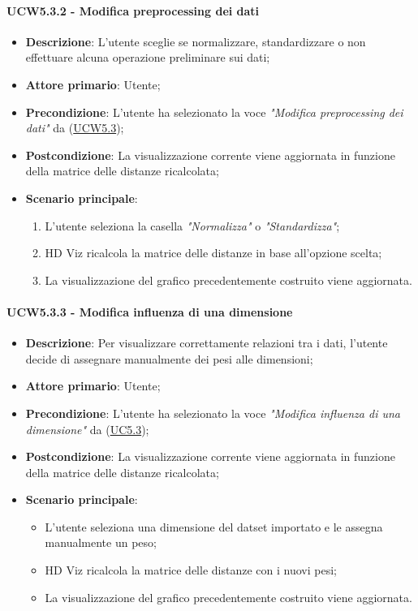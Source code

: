 \paragraph{UCW5.3.2 - Modifica preprocessing dei dati}
\label{par:ucw5.3.2}
\begin{itemize}
    \item \textbf{Descrizione}: L’utente sceglie se normalizzare, standardizzare o non effettuare alcuna operazione preliminare sui dati;

    \item \textbf{Attore primario}: Utente;
    \item \textbf{Precondizione}: L'utente ha selezionato la voce \emph{"Modifica preprocessing dei dati"} da (\hyperref[ssub:ucw5.3]{UCW5.3});
    \item \textbf{Postcondizione}: La visualizzazione corrente viene aggiornata in funzione della matrice delle distanze ricalcolata;
    \item \textbf{Scenario principale}:
          \begin{enumerate}
              \item L'utente seleziona la casella \emph{"Normalizza"} o \emph{"Standardizza"};
              \item HD Viz ricalcola la matrice delle distanze in base all'opzione scelta;
              \item La visualizzazione del grafico precedentemente costruito viene aggiornata.
          \end{enumerate}
\end{itemize}

\paragraph{UCW5.3.3 - Modifica influenza di una dimensione}
\label{par:ucw5.3.3}
\begin{itemize}
    \item \textbf{Descrizione}: Per visualizzare correttamente relazioni tra i dati,
          l’utente decide di assegnare manualmente dei pesi alle dimensioni;

    \item \textbf{Attore primario}: Utente;
    \item \textbf{Precondizione}: L'utente ha selezionato la voce \emph{"Modifica influenza di una dimensione"} da (\hyperref[ssub:uc5.3]{UC5.3});

    \item \textbf{Postcondizione}: La visualizzazione corrente viene aggiornata in funzione della matrice delle distanze ricalcolata;
    \item \textbf{Scenario principale}:
          \begin{itemize}
              \item L’utente seleziona una dimensione del datset importato e le assegna manualmente un peso;
              \item HD Viz ricalcola la matrice delle distanze con i nuovi pesi;
              \item La visualizzazione del grafico precedentemente costruito viene aggiornata.
          \end{itemize}
\end{itemize}

